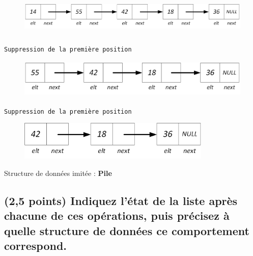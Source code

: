 \documentclass[11pt,a4paper]{article}
\begin{document}
\begin{center}
\begin{figure}[ht!]
\centering
\centerline{  %
\includegraphics[height=1.85cm]{img/p-2-Liste_p_5.png}
}
\end{figure}


\texttt{Suppression de la première position}

\begin{figure}[ht!]
\centering
\centerline{  %
\includegraphics[height=1.85cm]{img/p-1-Liste_p_4.png}
}
\end{figure}


\texttt{Suppression de la première position}

\begin{figure}[ht!]
\centering
\centerline{  %
\includegraphics[height=1.85cm]{img/Liste_p_1.png}
}
\end{figure}

\bigskip

\end{center}

Structure de données imitée : \textbf{Pile}



\newpage

\subsection{(2,5 points) Indiquez l'état de la liste après chacune de ces opérations, puis précisez à quelle structure de données ce comportement correspond. }

\end{document}
